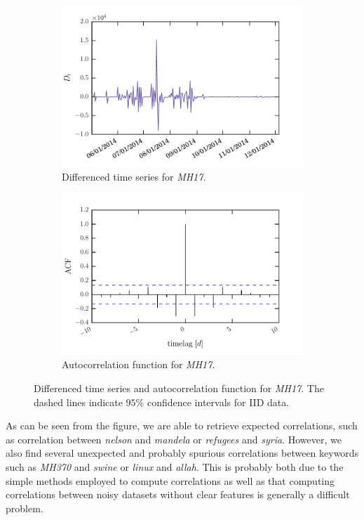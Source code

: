 \documentclass[12pt, a4paper]{article}
\begin{document}
\begin{figure}
\centering
\begin{subfigure}{.5\textwidth}
  \centering
  \includegraphics[width=.9\linewidth]{figs/mh17_diff.pdf}
  \caption{Differenced time series for \textit{MH17}.}
\end{subfigure}%
\begin{subfigure}{.5\textwidth}
  \centering
  \includegraphics[width=.9\linewidth]{figs/mh17_acf.pdf}
  \caption{Autocorrelation function for \textit{MH17}.}
\end{subfigure}
\caption{Differenced time series and autocorrelation function for \textit{MH17}. The dashed lines indicate $95 \%$ confidence intervals for IID data.}
\label{fig:diff_acf}
\end{figure}

As can be seen from the figure, we are able to retrieve expected correlations, such as correlation between \textit{nelson} and \textit{mandela} or \textit{refugees} and \textit{syria}. However, we also find several unexpected and probably spurious correlations between keywords such as \textit{MH370} and \textit{swine} or \textit{linux} and \textit{allah}. 
This is probably both due to the simple methods employed to compute correlations as well as that computing correlations between noisy datasets without clear features is generally a difficult problem.
\end{document}
